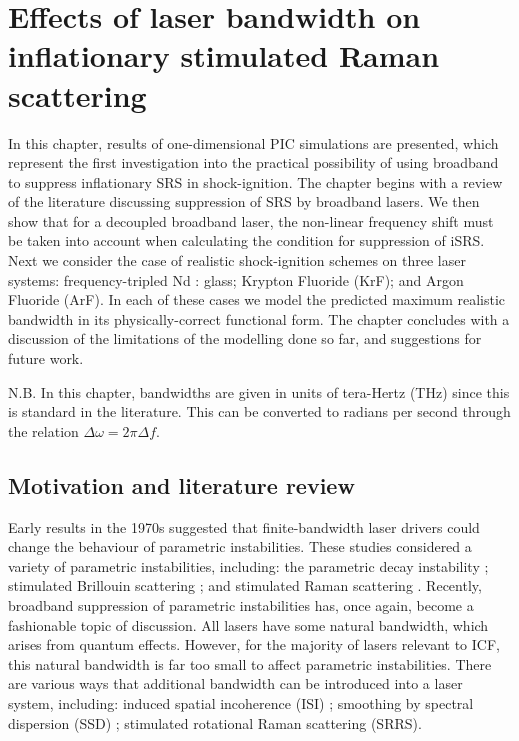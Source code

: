 \chapter{Effects of laser bandwidth on inflationary stimulated Raman scattering}
\label{chp:broadbandSRS}

In this chapter, results of one-dimensional PIC simulations are presented, which represent the first investigation into the practical possibility of using broadband to suppress inflationary SRS in shock-ignition. The chapter begins with a review of the literature discussing suppression of SRS by broadband lasers. We then show that for a decoupled broadband laser, the non-linear frequency shift must be taken into account when calculating the condition for suppression of iSRS. Next we consider the case of realistic shock-ignition schemes on three laser systems: frequency-tripled Nd : glass; Krypton Fluoride (KrF); and Argon Fluoride (ArF). In each of these cases we model the predicted maximum realistic bandwidth in its physically-correct functional form. The chapter concludes with a discussion of the limitations of the modelling done so far, and suggestions for future work.

N.B. In this chapter, bandwidths are given in units of tera-Hertz (THz) since this is standard in the literature. This can be converted to radians per second through the relation $\Delta \omega = 2\pi \Delta f$. 

\section{Motivation and literature review}

Early results in the 1970s suggested that finite-bandwidth laser drivers could change the behaviour of parametric instabilities. These studies considered a variety of parametric instabilities, including: the parametric decay instability \citep{Thomson1974}; stimulated Brillouin scattering \citep{Kruer1973}; and stimulated Raman scattering \citep{raymer_theory_1979}. Recently, broadband suppression of parametric instabilities has, once again, become a fashionable topic of discussion. All lasers have some natural bandwidth, which arises from quantum effects. However, for the majority of lasers relevant to ICF, this natural bandwidth is far too small to affect parametric instabilities. There are various ways that additional bandwidth can be introduced into a laser system, including: induced spatial incoherence (\acrshort{ISI}) \citep{Lehmberg198327}; smoothing by spectral dispersion (\acrshort{SSD}) \citep{Skupsky1989}; stimulated rotational Raman scattering (SRRS).

